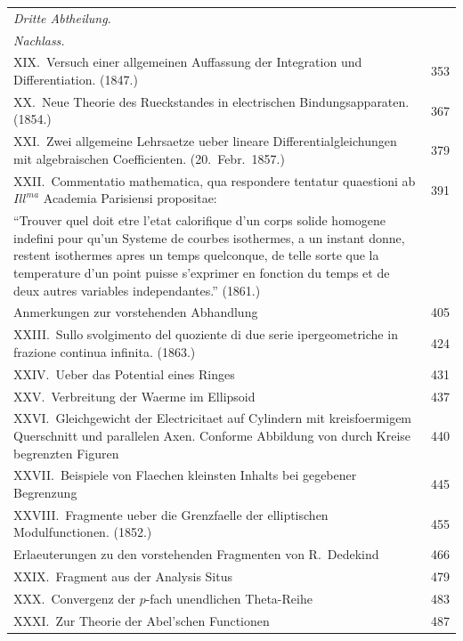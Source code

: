 \documentclass[12pt,a4paper]{book}
\theoremstyle{definition}
\theoremstyle{remark}
\begin{document}
\begin{longtable}{p{12cm}r}
\multicolumn{2}{l}{\textit{Dritte Abtheilung.}}\\
\multicolumn{2}{l}{\textit{Nachlass.}}\\[0.5em]

XIX.\ Versuch einer allgemeinen Auffassung der Integration und Differentiation. (1847.) & 353\\[0.5em]

XX.\ Neue Theorie des Rueckstandes in electrischen Bindungsapparaten. (1854.) & 367\\[0.5em]

XXI.\ Zwei allgemeine Lehrsaetze ueber lineare Differentialgleichungen mit algebraischen Coefficienten. (20.\ Febr.\ 1857.) & 379\\[0.5em]

XXII.\ Commentatio mathematica, qua respondere tentatur quaestioni ab $Ill^{ma}$ Academia Parisiensi propositae: & 391\\
\quad ``Trouver quel doit etre l'etat calorifique d'un corps solide homogene indefini pour qu'un Systeme de courbes isothermes, a un instant donne, restent isothermes apres un temps quelconque, de telle sorte que la temperature d'un point puisse s'exprimer en fonction du temps et de deux autres variables independantes.'' (1861.)\\
\quad Anmerkungen zur vorstehenden Abhandlung & 405\\[0.5em]

XXIII.\ Sullo svolgimento del quoziente di due serie ipergeometriche in frazione continua infinita. (1863.) & 424\\[0.5em]

XXIV.\ Ueber das Potential eines Ringes & 431\\[0.5em]

XXV.\ Verbreitung der Waerme im Ellipsoid & 437\\[0.5em]

XXVI.\ Gleichgewicht der Electricitaet auf Cylindern mit kreisfoermigem Querschnitt und parallelen Axen. Conforme Abbildung von durch Kreise begrenzten Figuren & 440\\[0.5em]

XXVII.\ Beispiele von Flaechen kleinsten Inhalts bei gegebener Begrenzung & 445\\[0.5em]

XXVIII.\ Fragmente ueber die Grenzfaelle der elliptischen Modulfunctionen. (1852.) & 455\\
\quad Erlaeuterungen zu den vorstehenden Fragmenten von R.\ Dedekind & 466\\[0.5em]

XXIX.\ Fragment aus der Analysis Situs & 479\\[0.5em]

XXX.\ Convergenz der $p$-fach unendlichen Theta-Reihe & 483\\[0.5em]

XXXI.\ Zur Theorie der Abel'schen Functionen & 487\\
\end{longtable}
\end{document}
